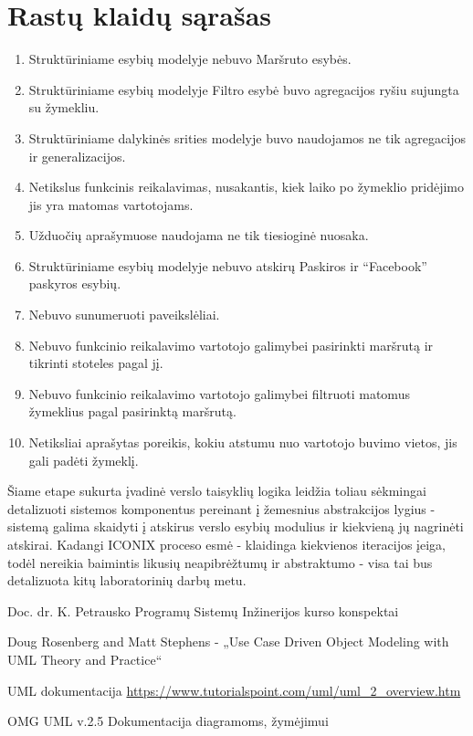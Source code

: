 \documentclass{VUMIFPSkursinis}
\begin{document}
\section{Rastų klaidų sąrašas}
	\begin{enumerate}[itemsep=-2mm]
		\item Struktūriniame esybių modelyje nebuvo Maršruto esybės.
		\item Struktūriniame esybių modelyje Filtro esybė buvo agregacijos ryšiu sujungta su žymekliu.
		\item Struktūriniame dalykinės srities modelyje buvo naudojamos ne tik agregacijos ir generalizacijos.
		\item Netikslus funkcinis reikalavimas, nusakantis, kiek laiko po žymeklio pridėjimo jis yra matomas vartotojams.
		\item Užduočių aprašymuose naudojama ne tik tiesioginė nuosaka.
		\item Struktūriniame esybių modelyje nebuvo atskirų Paskiros ir “Facebook” paskyros esybių.
		\item Nebuvo sunumeruoti paveikslėliai.
		\item Nebuvo funkcinio reikalavimo vartotojo galimybei pasirinkti maršrutą ir tikrinti stoteles pagal jį.
		\item Nebuvo funkcinio reikalavimo vartotojo galimybei filtruoti matomus žymeklius pagal pasirinktą maršrutą.
		\item Netiksliai aprašytas poreikis, kokiu atstumu nuo vartotojo buvimo vietos, jis gali padėti žymeklį.
	\end{enumerate}
Šiame etape sukurta įvadinė verslo taisyklių logika leidžia toliau sėkmingai detalizuoti sistemos komponentus pereinant į žemesnius abstrakcijos lygius - sistemą galima skaidyti į atskirus verslo esybių modulius ir kiekvieną jų nagrinėti atskirai. Kadangi ICONIX proceso esmė - klaidinga kiekvienos iteracijos įeiga, todėl nereikia baimintis likusių neapibrėžtumų ir abstraktumo - visa tai bus detalizuota kitų laboratorinių darbų metu.

\begin{enumerate}[label={[\arabic*]};itemsep=-2mm]
	\item Doc. dr. K. Petrausko Programų Sistemų Inžinerijos kurso konspektai
	\item Doug Rosenberg and Matt Stephens - „Use Case Driven Object Modeling with UML Theory and Practice“
	\item UML dokumentacija \url{https://www.tutorialspoint.com/uml/uml_2_overview.htm}
	\item OMG UML v.2.5 Dokumentacija diagramoms, žymėjimui
\end{enumerate}
\end{document}
